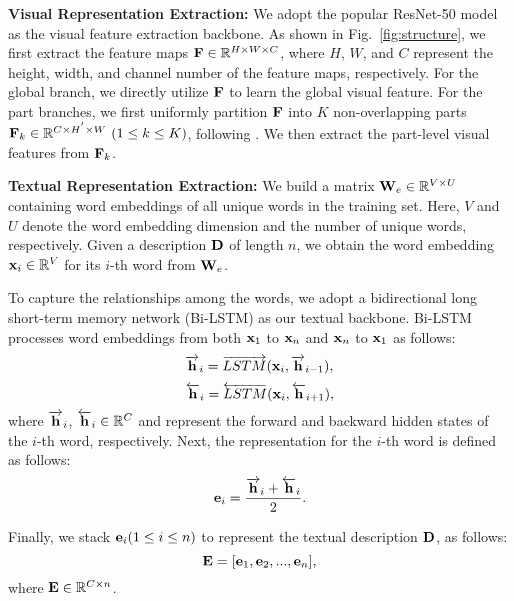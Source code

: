 \documentclass[journal]{IEEEtran}
\begin{document}
\noindent
\textbf{Visual Representation Extraction:} We adopt the popular ResNet-50 \cite{he2016deep} model as the visual feature extraction backbone. As shown in Fig.~\ref{fig:structure}, we first extract the feature maps ${\bf{F}}\in \mathbb{R}^{H \times W \times C}$, where $H$, $W$, and $C$ represent the height, width, and channel number of the feature maps, respectively. For the global branch, we directly utilize $\bf{F}$ to learn the global visual feature. For the part branches, we first uniformly partition ${\bf{F}}$ into $K$ non-overlapping parts ${\bf{F}}_{k} \in \mathbb{R}^{C\times H^{'} \times W}~(1\leq k \leq K)$, following \cite{sun2018beyond}. We then extract the part-level visual features from ${\bf{F}}_k$.

\noindent
\textbf{Textual Representation Extraction:} We build a matrix ${\bf{W}}_{e}\in \mathbb{R}^{V\times U}$ containing word embeddings of all unique words in the training set. Here, $V$ and $U$ denote the word embedding dimension and the number of unique words, respectively. Given a description $\bf{D}$ of length $n$, we obtain the word embedding ${\bf{x}}_{i} \in \mathbb{R}^{V}$  for its $i$-th word from ${\bf{W}}_{e}$.

To capture the relationships among the words, we adopt a bidirectional long short-term memory network (Bi-LSTM) \cite{hochreiter1997long} as our textual backbone. Bi-LSTM processes word embeddings from both ${\bf{x}}_1$ to ${\bf{x}}_n$ and ${\bf{x}}_n$ to ${\bf{x}}_1$ as follows:
\begin{equation}
\overrightarrow{\bf{h}}_i=\overrightarrow{LSTM}({\bf{x}}_i,\overrightarrow{{\bf{h}}}_{i-1}),
\end{equation}
\begin{equation}
\overleftarrow{\bf{h}}_i=\overleftarrow{LSTM}({\bf{x}}_i, \overleftarrow{{\bf{h}}}_{i+1}),
\end{equation}
where $\overrightarrow{\bf{h}}_i$, $\overleftarrow{\bf{h}}_i \in \mathbb{R}^{C}$ and represent the forward and backward hidden states of the $i$-th word, respectively. Next, the representation for the $i$-th word is defined as follows:
\begin{equation}
{\bf{e}}_{i} = \frac{\overrightarrow{\bf{h}}_{i}+\overleftarrow{\bf{h}}_{i}}{2}.
\end{equation}

Finally, we stack  ${\bf{e}}_{i}(1\leq i \leq n)$ to represent the textual description $\bf{D}$, as follows:
\begin{equation}
{\bf{E}} = [{\bf{e}}_{1}, {\bf{e}}_{2}, ..., {\bf{e}}_{n}],
\end{equation}
where ${\bf{E}} \in \mathbb{R}^{C\times  n}$.
\end{document}
